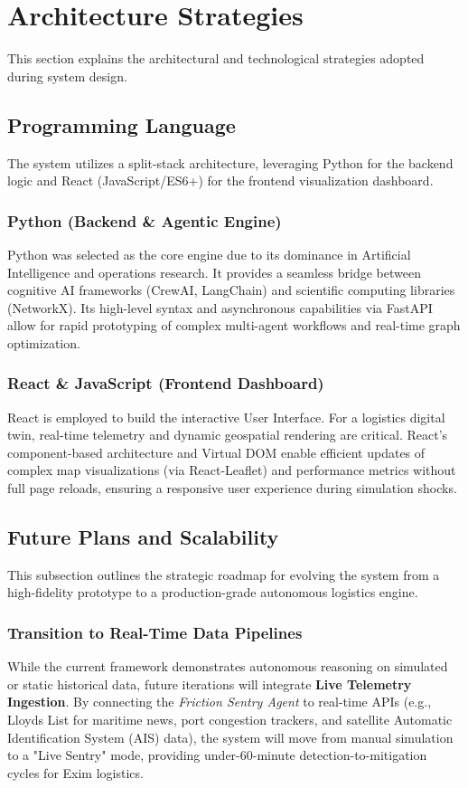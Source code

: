 \section[Architecture Strategies]{Architecture Strategies}
This section explains the architectural and technological strategies adopted during system
design.

\subsection[Programming Language]{Programming Language}
The system utilizes a split-stack architecture, leveraging Python for the backend logic and React (JavaScript/ES6+) for the frontend visualization dashboard.

\subsubsection{Python (Backend \& Agentic Engine)}
Python was selected as the core engine due to its dominance in Artificial Intelligence and operations research. It provides a seamless bridge between cognitive AI frameworks (CrewAI, LangChain) and scientific computing libraries (NetworkX). Its high-level syntax and asynchronous capabilities via FastAPI allow for rapid prototyping of complex multi-agent workflows and real-time graph optimization.

\subsubsection{React \& JavaScript (Frontend Dashboard)}
React is employed to build the interactive User Interface. For a logistics digital twin, real-time telemetry and dynamic geospatial rendering are critical. React’s component-based architecture and Virtual DOM enable efficient updates of complex map visualizations (via React-Leaflet) and performance metrics without full page reloads, ensuring a responsive user experience during simulation shocks.

\subsection[Future Plans and Scalability]{Future Plans and Scalability}
This subsection outlines the strategic roadmap for evolving the system from a high-fidelity prototype to a production-grade autonomous logistics engine.

\subsubsection{Transition to Real-Time Data Pipelines}
While the current framework demonstrates autonomous reasoning on simulated or static historical data, future iterations will integrate \textbf{Live Telemetry Ingestion}. By connecting the \textit{Friction Sentry Agent} to real-time APIs (e.g., Lloyds List for maritime news, port congestion trackers, and satellite Automatic Identification System (AIS) data), the system will move from manual simulation to a "Live Sentry" mode, providing under-60-minute detection-to-mitigation cycles for Exim logistics.

